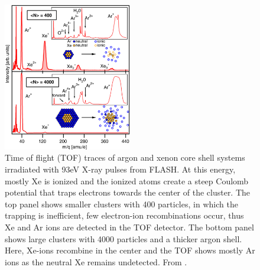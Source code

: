 \begin{figure}
	\centering
		\includegraphics[width=0.50\textwidth]{images/Hoener-image.jpg}
	\caption[Time of flight spectra of argon and xenon core-shell systems.]{Time of flight (TOF) traces of argon and xenon core shell systems irradiated with 93eV X-ray pulses from FLASH. At this energy, mostly Xe is ionized and the ionized atoms create a steep Coulomb potential that traps electrons towards the center of the cluster. The top panel shows smaller clusters with 400 particles, in which the trapping is inefficient, few electron-ion recombinations occur, thus Xe and Ar ions are detected in the TOF detector. The bottom panel shows large clusters with 4000 particles and a thicker argon shell. Here, Xe-ions recombine in the center and the TOF shows mostly Ar ions as the neutral Xe remains undetected. From \citep[\href{https://creativecommons.org/licenses/by/3.0/}{\ccby}]{Hoener-2008-JPB}.}
	\label{fig:Hoener-image}
\end{figure}
